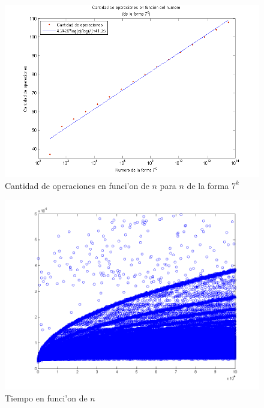 \begin{figure}[H]
\centering
\includegraphics[scale=0.8]{../../codigo/ejercicio1/benchmark/graficos/potencias_de_7/graficoPotenciasDe7.png}
\caption{Cantidad de operaciones en funci'on de $n$ para $n$ de la forma $7^k$}
\end{figure}

\begin{figure}[H]
\centering
\includegraphics[scale=0.5]{../../codigo/ejercicio1/benchmark_de_tiempo/graficos/todos_los_numeros/todosLosNumerosPuntosTiempo.png}
\caption{Tiempo en funci'on de $n$}
\end{figure}


